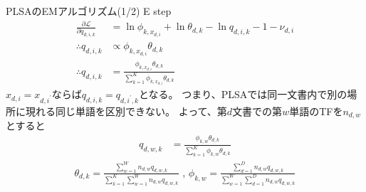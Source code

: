 \documentclass[aspectratio=169,unicode,dvipdfmx,14pt]{beamer}
\begin{document}
\begin{frame}{PLSAのEMアルゴリズム(1/2)}
\FontMath
E step
\begin{align}
\frac{\partial \mathcal{L}}{\partial q_{d,i,k}}
& = \ln \phi_{k, x_{d,i}} + \ln \theta_{d,k} - \ln q_{d,i,k} - 1 - \nu_{d,i}
\\
\therefore q_{d,i,k} & \propto \phi_{k, x_{d,i}} \theta_{d,k}
\\
\therefore q_{d,i,k} & = \frac{ \phi_{k, x_{d,i}} \theta_{d,k} }{ \sum_{k=1}^K \phi_{k, x_{d,i}} \theta_{d,k} }
\end{align}
$x_{d,i} = x_{d,i^\prime}$ならば$q_{d,i,k} = q_{d,i^\prime,k}$となる。
つまり、PLSAでは同一文書内で別の場所に現れる同じ単語を区別できない。
よって、第$d$文書での第$w$単語のTFを$n_{d,w}$とすると
\begin{align}
q_{d,w,k} & = \frac{ \phi_{k, w} \theta_{d,k} }{ \sum_{k=1}^K \phi_{k, w} \theta_{d,k} }
\end{align}
\begin{align}
\theta_{d,k} = \frac{ \sum_{w=1}^W n_{d,w} q_{d,w,k} }{ \sum_{k=1}^K \sum_{w=1}^W n_{d,w} q_{d,w,k} }
\mbox{ , \ }
\phi_{k,w} 
= \frac{ \sum_{d=1}^D n_{d,w} q_{d,w,k} }
{ \sum_{w=1}^W \sum_{d=1}^D n_{d,w} q_{d,w,k} }
\end{align}
\end{frame}
\end{document}
